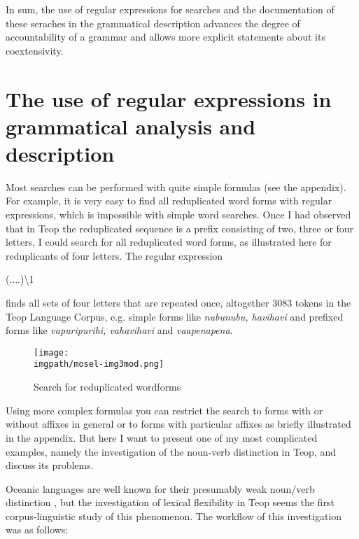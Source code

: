 In sum, the use of regular expressions for searches and the documentation of these seraches in the grammatical description advances the degree of accountability of a grammar and allows more explicit statements about its coextensivity. 

\section{The use of regular expressions in grammatical analysis and description }%


Most searches can be performed with quite simple formulas (see the appendix). For example, it is very easy to find all reduplicated word forms with regular expressions, which is impossible with simple word searches. Once I had observed that in Teop the reduplicated sequence is a prefix consisting of two, three or four letters, I could search for all reduplicated word forms, as illustrated here for reduplicants of four letters. The regular expression


\ea \label{ex:m1} (....){\textbackslash}1 
\z

\noindent
finds all sets of four letters that are repeated once, altogether 3083 tokens in the Teop Language Corpus, e.g. simple forms like \textit{nubunubu, havihavi} and prefixed forms like \textit{vapuripurihi, vahavihavi} and \textit{vaapenapena}.

\begin{figure}  
\begin{center}
\texttt{[image: \\imgpath/mosel-img3mod.png]}
\end{center}
\caption{Search for reduplicated wordforms}
\label{fig:m10-1}
\end{figure}


Using more complex formulas you can restrict the search to forms with or without affixes in general or to forms with particular affixes as briefly illustrated in the appendix. But here I want to present one of my most complicated examples, namely the investigation of the noun-verb distinction in Teop, and discuss its problems.

Oceanic languages are well known for their presumably weak noun/verb distinction \citep{HengeveldEtAl2004,HengeveldEtAl2005}, but the investigation of lexical flexibility in Teop seems the first corpus-linguistic study of this phenomenon. The workflow of this investigation was as follows:

